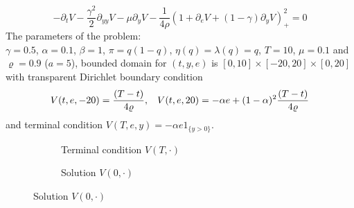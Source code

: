 \documentclass[border=10pt]{article}
\begin{document}
\[  -\partial_t V - \frac{\gamma^2}{2}\partial_{yy} V -\mu \partial_{y} V -\frac{1}{4\rho}(1+\partial_e V + (1-\gamma)\partial_y V)_+^2 = 0  \]   
The parameters of the problem:\\ 
$\gamma=0.5$, $\alpha=0.1$, $\beta=1$, $\pi=q(1-q)$, $\eta(q)=\lambda(q)=q$, $T=10$, $\mu=0.1$ and $\varrho=0.9$ ($a=5$),  bounded domain for $(t,y,e)$ is $[0,10]\times[-20, 20]\times[0,20]$ with transparent Dirichlet boundary condition 
\[V(t,e,-20)=\frac{(T-t)}{4\varrho},\hspace*{.3cm} V(t,e,20)=-\alpha e+(1-\alpha)^2\frac{(T-t)}{4\varrho}
\]
and terminal condition $V(T,e,y)=-\alpha e1_{\{y>0\}}$.
\begin{figure}
\begin{subfigure}[b]{0.5\textwidth}
\centering
{}
\caption{Terminal condition $V(T,\cdot)$}
\end{subfigure}
\begin{subfigure}[b]{0.5\textwidth}
\centering
{}
\caption{Solution $V(0,\cdot)$}
\end{subfigure}
\end{figure}
\end{document}
